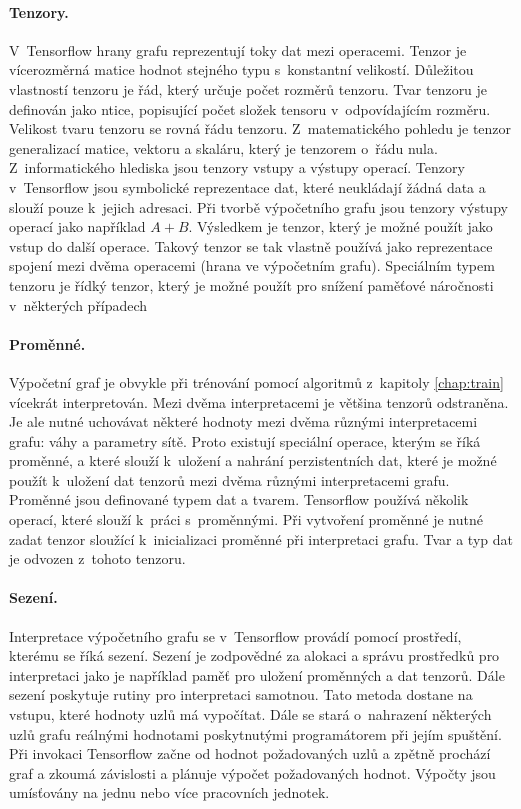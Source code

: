\paragraph{Tenzory.}
V~Tensorflow hrany grafu reprezentují toky dat mezi operacemi.
Tenzor je vícerozměrná matice hodnot stejného typu s~konstantní velikostí.
Důležitou vlastností tenzoru je řád, který určuje počet rozměrů tenzoru.
Tvar tenzoru je definován jako ntice, popisující počet složek tensoru v~odpovídajícím rozměru.
Velikost tvaru tenzoru se rovná řádu tenzoru.
Z~matematického pohledu je tenzor generalizací matice, vektoru a skaláru, který je tenzorem o~řádu nula.
Z~informatického hlediska jsou tenzory vstupy a výstupy operací.
Tenzory v~Tensorflow jsou symbolické reprezentace dat, které neukládají žádná data a slouží pouze k~jejich adresaci.
Při tvorbě výpočetního grafu jsou tenzory výstupy operací jako například $A+B$.
Výsledkem je tenzor, který je možné použít jako vstup do další operace.
Takový tenzor se tak vlastně používá jako reprezentace spojení mezi dvěma operacemi (hrana ve výpočetním grafu).
Speciálním typem tenzoru je řídký tenzor, který je možné použít pro snížení paměťové náročnosti v~některých případech

\paragraph{Proměnné.}
Výpočetní graf je obvykle při trénování pomocí algoritmů z~kapitoly \ref{chap:train} vícekrát interpretován.
Mezi dvěma interpretacemi je většina tenzorů odstraněna.
Je ale nutné uchovávat některé hodnoty mezi dvěma různými interpretacemi grafu: váhy a parametry sítě.
Proto existují speciální operace, kterým se říká proměnné, a které slouží k~uložení a nahrání perzistentních dat, které je možné použít k~uložení dat tenzorů mezi dvěma různými interpretacemi grafu.
Proměnné jsou definované typem dat a tvarem.
Tensorflow používá několik operací, které slouží k~práci s~proměnnými.
Při vytvoření proměnné je nutné zadat tenzor sloužící k~inicializaci proměnné při interpretaci grafu.
Tvar a typ dat je odvozen z~tohoto tenzoru.

\paragraph{Sezení.}
Interpretace výpočetního grafu se v~Tensorflow provádí pomocí prostředí, kterému se říká sezení.
Sezení je zodpovědné za alokaci a správu prostředků pro interpretaci jako je například paměť pro uložení proměnných a dat tenzorů.
Dále sezení poskytuje rutiny pro interpretaci samotnou.
Tato metoda dostane na vstupu, které hodnoty uzlů má vypočítat.
Dále se stará o~nahrazení některých uzlů grafu reálnými hodnotami poskytnutými programátorem při jejím spuštění.
Při invokaci Tensorflow začne od hodnot požadovaných uzlů a zpětně prochází graf a zkoumá závislosti a plánuje výpočet požadovaných hodnot.
Výpočty jsou umísťovány na jednu nebo více pracovních jednotek.

